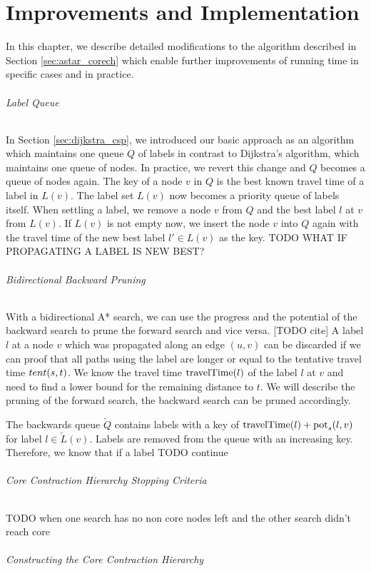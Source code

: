 
\chapter{Improvements and Implementation\label{ch:impl}}
In this chapter, we describe detailed modifications to the algorithm described in Section \ref{sec:astar_corech} which enable further improvements of running time in specific cases and in practice.

\subparagraph{Label Queue}
In Section \ref{sec:dijkstra_csp}, we introduced our basic approach as an algorithm which maintains one queue $Q$ of labels in contrast to Dijkstra's algorithm, which maintains one queue of nodes. In practice, we revert this change and $Q$ becomes a queue of nodes again. The key of a node $v$ in $Q$ is the best known travel time of a label in $L(v)$. The label set $L(v)$ now becomes a priority queue of labels itself. When settling a label, we remove a node $v$ from $Q$ and the best label $l$ at $v$ from $L(v)$. If $L(v)$ is not empty now, we insert the node $v$ into $Q$ again with the travel time of the new best label $l' \in L(v)$ as the key. TODO WHAT IF PROPAGATING A LABEL IS NEW BEST?

\subparagraph{Bidirectional Backward Pruning}
With a bidirectional A* search, we can use the progress and the potential of the backward search to prune the forward search and vice versa. [TODO cite] A label $l$ at a node $v$ which was propagated along an edge $(u,v)$ can be discarded if we can proof that all paths using the label are longer or equal to the tentative travel time $tent(s,t)$. We know the travel time $\operatorname{travelTime}(l)$ of the label $l$ at $v$ and need to find a lower bound for the remaining distance to $t$. We will describe the pruning of the forward search, the backward search can be pruned accordingly.

The backwards queue $\overleftarrow{Q}$ contains labels with a key of $\operatorname{travelTime}(l) + \operatorname{pot}_s(l,v)$ for label $l \in \overleftarrow{L}(v)$. Labels are removed from the queue with an increasing key. Therefore, we know that if a label  TODO continue

\subparagraph{Core Contraction Hierarchy Stopping Criteria}
TODO when one search has no non core nodes left and the other search didn't reach core
\subparagraph{Constructing the Core Contraction Hierarchy}
